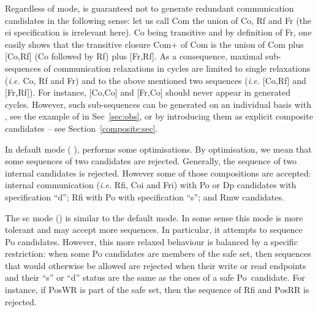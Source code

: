 Regardless of mode, \diy{} is guaranteed not to
generate redundant communication candidates in the following sense:
let us call Com the union of Co, Rf and Fr (the e\vbar{}i specification
is irrelevant here).
Co being transitive and by definition of Fr,
one easily shows that the transitive closure Com+ of Com is the union
of Com plus [Co,Rf] (Co followed by Rf) plus [Fr,Rf].
As a consequence, maximal sub-sequences of communication
relaxations in \diy{} cycles are limited
to  single relaxations (\emph{i.e.} Co, Rf and Fr)
and to the above mentioned two sequences
(\emph{i.e.} [Co,Rf] and  [Fr,Rf]).
For instance, [Co,Co] and [Fr,Co] should never appear in \diy{} generated
cycles. However, such sub-sequences can be generated on an individual basis with
\diyone, see the example of  in Sec~\ref{sec:obs},
or by introducing them as explicit composite candidates -- see Section~\ref{composite:sec}.

\label{default:def}In default mode ( ), \diy{} performs some optimisations. By optimisation, we mean that some sequences of two candidates are rejected. Generally, the sequence of  two internal candidates is rejected. However some of those compositions are accepted: internal communication (\emph{i.e.} Rfi, Coi and Fri) with Po or Dp candidates with specification ``d'';
Rfi with Po with specification ``s''; and Rmw candidates.

\label{sc:def}The sc mode () is similar to the default mode. In some sense this mode is more tolerant and may accept more sequences. In particular, it attempts to sequence Po candidates. However, this more relaxed behaviour is balanced by a specific restriction: when some Po candidates are members of the safe set, then sequences that would otherwise be allowed are rejected when their write or read endpoints and their ``s'' or ``d'' status are the same as  the ones of a safe Po~candidate. For instance, if PosWR is part of the safe set, then the sequence of Rfi and PosRR is rejected.

